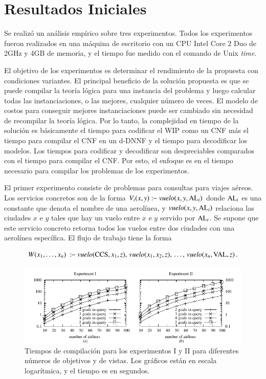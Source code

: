 \section{Resultados Iniciales}

Se realizó un análisis empírico sobre tres experimentos. Todos los experimentos
fueron realizados en una máquina de escritorio con un CPU Intel Core 2 Duo de
2GHz y 4GB de memoria, y el tiempo fue medido con el comando de Unix
\emph{time}.

El objetivo de los experimentos es determinar el rendimiento de la propuesta con
condiciones variantes. El principal beneficio de la solución propuesta es
que se puede compilar la teoría lógica para una instancia del problema y luego
calcular todas las instanciaciones, o las mejores, cualquier número de veces. El
modelo de costos para conseguir mejores instanciaciones puede ser cambiado sin
necesidad de recompilar la teoría lógica. Por lo tanto, la complejidad en tiempo
de la solución es básicamente el tiempo para codificar el WIP como un
CNF más el tiempo para compilar el CNF en un d-DNNF y el tiempo para decodificar
los modelos. Los tiempos para codificar y decodificar son despreciables
comparados con el tiempo para compilar el CNF. Por esto, el enfoque es en el tiempo
necesario para compilar los problemas de los experimentos.

El primer experimento consiste de problemas para consultas para viajes aéreos.
Los servicios concretos son de la forma $V_i(x,y):\!\!-\ \text{\it vuelo}(x,y,\text{AL}_i)$
donde $\text{AL}_i$ es una
constante que denota el nombre de una aerolínea, y $\text{\it vuelo}(x,y,\text{AL}_i)$ relaciona las
ciudades $x$ e $y$ tales que hay un vuelo entre $x$ e $y$ servido por $\text{AL}_i$.
Se supone que este servicio concreto retorna todos los vuelos entre dos ciudades
con una aerolínea específica. El flujo de trabajo tiene la forma

\[ W(x_1,\ldots,x_n)\ \qrule\ \vuelo(\PA,x_1,z),\,\vuelo(x_1,x_2,z),\,\ldots,\,\vuelo(x_n,\NY,z)\,. \]

\begin{figure}[t]
\centering
\includegraphics[width=1\textwidth]{graphics/plot1}
\caption{Tiempos de compilación para los experimentos I y II para diferentes
números de objetivos y de vistas. Los gráficos están en escala logarítmica, y el
tiempo es en segundos.}
\label{fig:plot1}
\end{figure}


